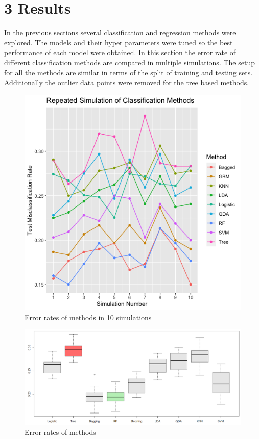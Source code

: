 \documentclass{article}
\begin{document}
\section{3   Results}
In the previous sections several classification and regression methods  were explored. The models and their hyper parameters were tuned so the best performance of each model were obtained. In this section the error rate of different classification methods are compared in multiple simulations. The setup for all the methods are similar in terms of the split of training and testing sets. Additionally the outlier data points were removed for the tree based methods.
\begin{figure}[H]
    \centering
    \includegraphics[scale=0.6]{finalErrorPlots.png}
    \caption{Error rates of methods in 10 simulations}
    \label{sims}
\end{figure}
\begin{figure}[H]
    \centering
    \includegraphics[scale=0.4]{Boxplot2.PNG}
    \caption{Error rates of methods}
    \label{sims2}
\end{figure}
\end{document}
